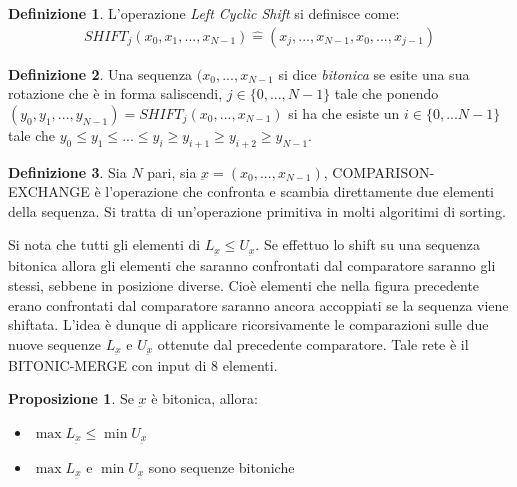 \documentclass[a4paper,portrait,12pt]{article}
\theoremstyle{definition}
\newtheorem{definition}{Definizione}[section]
\newtheorem{proposition}{Proposizione}
\begin{document}
\begin{definition}
L’operazione \textit{Left Cyclìc Shift} si definisce come:
\begin{align*}
SHIFT_j(x_0,x_1,...,x_{N-1}) \hat{=} (x_j,...,x_{N-1},x_0,...,x_{j-1})
\end{align*}
\end{definition}

\begin{definition}
Una sequenza $(x_0,...,x_{N-1}$ si dice \textit{bitonica} se esite una sua rotazione che è in forma saliscendi, $j \in \{0,...,N-1\}$ tale che ponendo $(y_0, y_1,...,y_{N-1}) = SHIFT_j(x_0,...,x_{N-1})$ si ha che esiste un $i \in \{0,...N-1\}$ tale che $y_0 \le y_1 \le ... \le y_i \ge y_{i+1} \ge y_{i+2} \ge y_{N-1}$.
\end{definition}

\begin{definition}
Sia $N$ pari, sia $\underbar{x} = (x_0,...,x_{N-1})$, COMPARISON-EXCHANGE è l'operazione che confronta e scambia direttamente due elementi della sequenza. Si tratta di un'operazione primitiva in molti algoritimi di sorting.
\end{definition}

Si nota che tutti gli elementi di $L_{\underbar{x}} \le U_{\underbar{x}}$.
Se effettuo lo shift su una sequenza bitonica allora gli
elementi che saranno confrontati dal comparatore saranno gli stessi, sebbene in posizione diverse.
Cioè elementi che nella figura precedente erano confrontati dal comparatore saranno ancora accoppiati se la sequenza viene shiftata.
L’idea è dunque di applicare ricorsivamente le comparazioni sulle due nuove sequenze $L_{\underbar{x}}$ e $U_{\underbar{x}}$ ottenute dal precedente comparatore.
Tale rete è il BITONIC-MERGE con input di 8 elementi.

\begin{proposition}
Se $\underbar{x}$ è bitonica, allora:
\begin{itemize}
\item $\max{L_{\underbar{x}}} \le \min{U_{\underbar{x}}}$
\item $\max{L_{\underbar{x}}}$ e $\min{U_{\underbar{x}}}$ sono sequenze bitoniche
\end{itemize}
\end{proposition}
\end{document}
